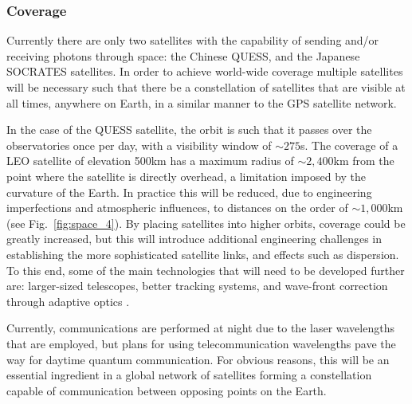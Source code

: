 %
%

\subsubsection{Coverage}

Currently there are only two satellites with the capability of sending and/or receiving photons through space: the Chinese QUESS, and the Japanese SOCRATES satellites. In order to achieve world-wide coverage multiple satellites will be necessary such that there be a constellation of satellites that are visible at all times, anywhere on Earth, in a similar manner to the GPS satellite network.

In the case of the QUESS satellite, the orbit is such that it passes over the observatories once per day, with a visibility window of $\sim 275$s. The coverage of a LEO satellite of elevation 500km has a maximum radius of $\sim 2,400$km from the point where the satellite is directly overhead, a limitation imposed by the curvature of the Earth. In practice this will be reduced, due to engineering imperfections and atmospheric influences, to distances on the order of $\sim 1,000$km (see Fig.~\ref{fig:space_4}). By placing satellites into higher orbits, coverage could be greatly increased, but this will introduce additional engineering challenges in establishing the more sophisticated satellite links, and effects such as dispersion. To this end, some of the main technologies that will need to be developed further are: larger-sized telescopes, better tracking systems, and wave-front correction through adaptive optics \cite{bib:liao2017satellite}.

Currently, communications are performed at night due to the laser wavelengths that are employed, but plans for using telecommunication wavelengths pave the way for daytime quantum communication. For obvious reasons, this will be an essential ingredient in a global network of satellites forming a constellation capable of communication between opposing points on the Earth.

